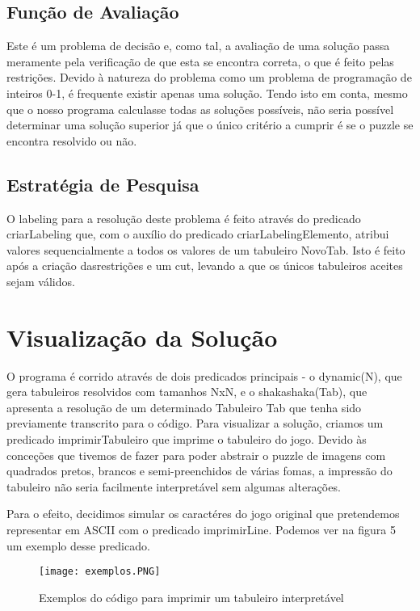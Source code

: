 \documentclass[runningheads]{llncs}
\begin{document}
\subsection{Função de Avaliação}
Este é um problema de decisão e, como tal, a avaliação de uma solução passa meramente pela verificação de que esta se encontra correta, o que é feito pelas restrições. Devido à natureza do problema como um problema de programação de inteiros 0-1, é frequente existir apenas uma solução. Tendo isto em conta, mesmo que o nosso programa calculasse todas as soluções possíveis, não seria possível determinar uma solução superior já que o único critério a cumprir é se o puzzle se encontra resolvido ou não.

\subsection{Estratégia de Pesquisa}
O labeling para a resolução deste problema é feito através do predicado criarLabeling que, com o auxílio do predicado criarLabelingElemento, atribui valores sequencialmente a todos os valores de um tabuleiro NovoTab. Isto é feito após a criação dasrestrições e um cut, levando a que os únicos tabuleiros aceites sejam válidos.

\section{Visualização da Solução}
O programa é corrido através de dois predicados principais - o dynamic(N), que gera tabuleiros resolvidos com tamanhos NxN, e o shakashaka(Tab), que apresenta a resolução de um determinado Tabuleiro Tab que tenha sido previamente transcrito para o código.
Para visualizar a solução, criamos um predicado imprimirTabuleiro que imprime o tabuleiro do jogo. Devido às conceções que tivemos de fazer para poder abstrair o puzzle de imagens com quadrados pretos, brancos e semi-preenchidos de várias fomas, a impressão do tabuleiro não seria facilmente interpretável sem algumas alterações.

Para o efeito, decidimos simular os caractéres do jogo original que pretendemos representar em ASCII com o predicado imprimirLine. Podemos ver na figura 5 um exemplo desse predicado.

\begin{figure}
\begin{center}
\texttt{[image: exemplos.PNG]}
\caption{Exemplos do código para imprimir um tabuleiro interpretável} 
\label{exemplos.PNG}
\end{center}
\end{figure}
\end{document}
